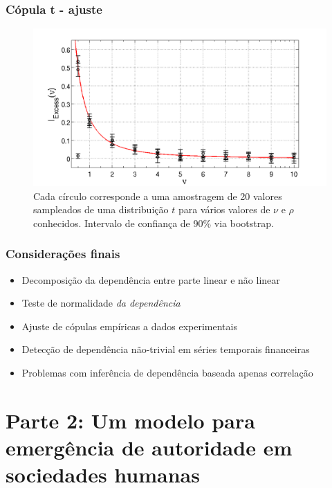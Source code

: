 \documentclass[ignorenonframetext,]{beamer}
\makeatletter
\def\ScaleIfNeededV{%
  \ifdim\Gin@nat@width>0.9\linewidth
    0.9\linewidth
  \else
    \Gin@nat@width
  \fi
}
\def\ScaleIfNeededH{%
  \ifdim\Gin@nat@height>0.9\textheight
    0.9\textheight
  \else
    \Gin@nat@height
  \fi
}
\let\Oldincludegraphics\includegraphics
\renewcommand{\includegraphics}[2][]{\Oldincludegraphics[width=\ScaleIfNeededV,height=\ScaleIfNeededH,keepaspectratio]{#2}}
\makeatother
\begin{document}
\begin{frame}\frametitle{Cópula t - ajuste}

\begin{figure}[htbp]
\centering
\includegraphics{./figs/I_Excess.png}
\caption{Cada círculo corresponde a uma amostragem de 20 valores
sampleados de uma distribuição $t$ para vários valores de $\nu$ e $\rho$
conhecidos. Intervalo de confiança de 90\% via bootstrap.}
\end{figure}

\end{frame}

\begin{frame}\frametitle{Considerações finais}

\begin{itemize}
\itemsep1pt\parskip0pt
\item
  Decomposição da dependência entre parte linear e não linear
\item
  Teste de normalidade \emph{da dependência}
\item
  Ajuste de cópulas empíricas a dados experimentais
\item
  Detecção de dependência não-trivial em séries temporais financeiras
\item
  Problemas com inferência de dependência baseada apenas correlação
\end{itemize}

\end{frame}

\section{Parte 2: Um modelo para emergência de autoridade em sociedades
humanas}
\end{document}

